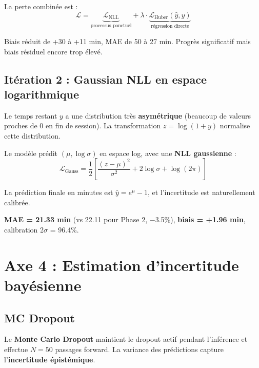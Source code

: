 \documentclass[11pt,a4paper]{article}
\newenvironment{keybox}[1]
  {\begin{tcolorbox}[colback=meteoGray,colframe=meteoBlue,title={\textbf{#1}},
    fonttitle=\small, boxrule=0.6pt, arc=3pt]}
  {\end{tcolorbox}}
\begin{document}
La perte combinée est :
\begin{equation}
\mathcal{L} = \underbrace{\mathcal{L}_{\text{NLL}}}_{\text{processus ponctuel}} + \lambda \cdot \underbrace{\mathcal{L}_{\text{Huber}}(\hat{y}, y)}_{\text{régression directe}}
\end{equation}

\begin{keybox}{Résultat — Itération 1}
Biais réduit de +30 à +11 min, MAE de 50 à 27 min. Progrès significatif mais biais résiduel encore trop élevé.
\end{keybox}

\subsection{Itération 2 : Gaussian NLL en espace logarithmique}

Le temps restant $y$ a une distribution très \textbf{asymétrique} (beaucoup de valeurs proches de 0 en fin de session). La transformation $z = \log(1 + y)$ normalise cette distribution.

Le modèle prédit $(\mu, \log\sigma)$ en espace log, avec une \textbf{NLL gaussienne} :
\begin{equation}
\mathcal{L}_{\text{Gauss}} = \frac{1}{2} \left[ \frac{(z - \mu)^2}{\sigma^2} + 2\log\sigma + \log(2\pi) \right]
\end{equation}

La prédiction finale en minutes est $\hat{y} = e^{\mu} - 1$, et l'incertitude est naturellement calibrée.

\begin{keybox}{Résultat — Itération 2 (finale)}
\textbf{MAE = 21.33 min} (vs 22.11 pour Phase 2, $-$3.5\%), \textbf{biais = +1.96 min}, calibration 2$\sigma$ = 96.4\%.
\end{keybox}


\section{Axe 4 : Estimation d'incertitude bayésienne}

\subsection{MC Dropout}

Le \textbf{Monte Carlo Dropout} maintient le dropout actif pendant l'inférence et effectue $N=50$ passages forward. La variance des prédictions capture l'\textbf{incertitude épistémique}.
\end{document}
